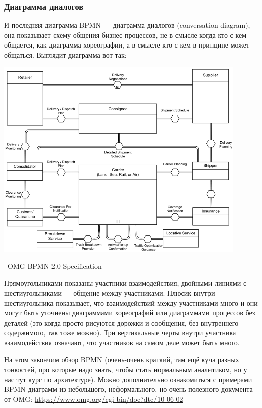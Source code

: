 \documentclass[a5paper]{article}
\newcommand{\attribution}[1] {
    \vspace{-4mm}\begin{flushright}\begin{scriptsize}%
    {\textcopyright\, #1}\end{scriptsize}\end{flushright}
}
\begin{document}
\subsubsection{Диаграмма диалогов}

И последняя диаграмма BPMN --- диаграмма диалогов (conversation diagram), она показывает схему общения бизнес-процессов, не в смысле когда кто с кем общается, как диаграмма хореографии, а в смысле кто с кем в принципе может общаться. Выглядит диаграмма вот так:

\begin{center}
    \includegraphics[width=0.9\textwidth]{bpmnConversation.png}
    \attribution{OMG BPMN 2.0 Specification}
\end{center}

Прямоугольниками показаны участники взаимодействия, двойными линиями с шестиугольниками --- общение между участниками. Плюсик внутри шестиугольника показывает, что взаимодействий между участниками много и они могут быть уточнены диаграммами хореографий или диаграммами процессов без деталей (это когда просто рисуются дорожки и сообщения, без внутреннего содержимого, так тоже можно). Три вертикальные черты внутри участника взаимодействия означают, что участников на самом деле может быть много.

На этом закончим обзор BPMN (очень-очень краткий, там ещё куча разных тонкостей, про которые надо знать, чтобы стать нормальным аналитиком, но у нас тут курс по архитектуре). Можно дополнительно ознакомиться с примерами BPMN-диаграмм из небольшого, неформального, но очень полезного документа от OMG: \url{https://www.omg.org/cgi-bin/doc?dtc/10-06-02}
\end{document}
